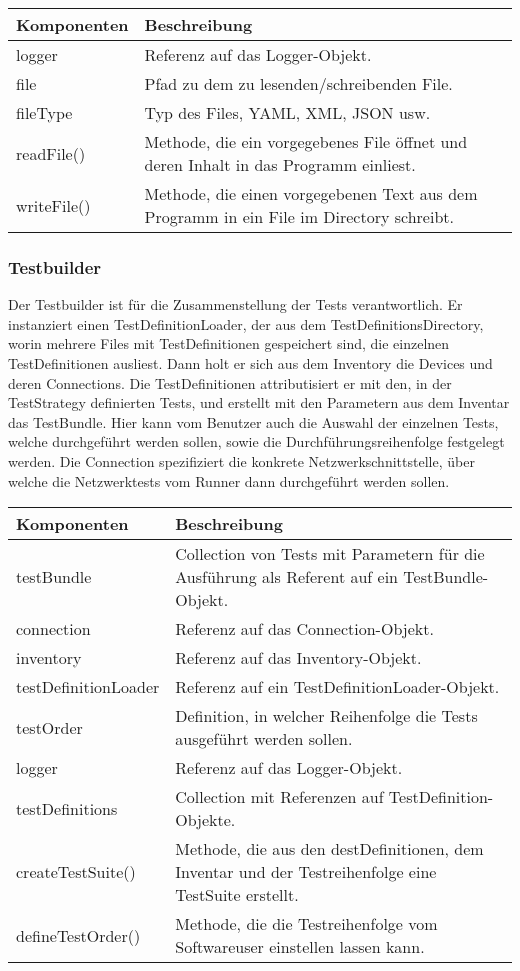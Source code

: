 \documentclass[
	ngerman,
	toc=listof, %
	toc=bibliography, %
	footnotes=multiple, %
	parskip=half, %
	numbers=noendperiod %
]{scrartcl}
\begin{document}
	\begin{tabularx}{\textwidth}{lX}
		\toprule
			Komponenten & Beschreibung \\
		\midrule
			logger & Referenz auf das Logger-Objekt. \\
			file & Pfad zu dem zu lesenden/schreibenden File. \\
			fileType & Typ des Files, YAML, XML, JSON usw. \\
		\midrule
			readFile() & Methode, die ein vorgegebenes File öffnet und deren Inhalt in das Programm einliest. \\
			writeFile() & Methode, die einen vorgegebenen Text aus dem Programm in ein File im Directory schreibt. \\
		\bottomrule
	\end{tabularx}

	\subsubsection{Testbuilder}
	Der Testbuilder ist für die Zusammenstellung der Tests verantwortlich. 
	Er instanziert einen TestDefinitionLoader, der aus dem TestDefinitionsDirectory, worin mehrere Files mit TestDefinitionen gespeichert sind, die einzelnen TestDefinitionen ausliest.
	Dann holt er sich aus dem Inventory die Devices und deren Connections. 
	Die TestDefinitionen attributisiert er mit den, in der TestStrategy definierten Tests, und erstellt mit den Parametern aus dem Inventar das TestBundle. 
	Hier kann vom Benutzer auch die Auswahl der einzelnen Tests, welche durchgeführt werden sollen, sowie die Durchführungsreihenfolge festgelegt werden.
	Die Connection spezifiziert die konkrete Netzwerkschnittstelle, über welche die Netzwerktests vom Runner dann durchgeführt werden sollen.

	\begin{tabularx}{\textwidth}{lX}
		\toprule
			Komponenten & Beschreibung \\
		\midrule
			testBundle & Collection von Tests mit Parametern für die Ausführung als Referent auf ein TestBundle-Objekt. \\
			connection & Referenz auf das Connection-Objekt. \\
			inventory & Referenz auf das Inventory-Objekt. \\
			testDefinitionLoader & Referenz auf ein TestDefinitionLoader-Objekt.\\
			testOrder & Definition, in welcher Reihenfolge die Tests ausgeführt werden sollen. \\
			logger & Referenz auf das Logger-Objekt.  \\
			testDefinitions & Collection mit Referenzen auf TestDefinition-Objekte. \\
		\midrule
			createTestSuite() & Methode, die aus den destDefinitionen, dem Inventar und der Testreihenfolge eine TestSuite erstellt. \\
			defineTestOrder() & Methode, die die Testreihenfolge vom Softwareuser einstellen lassen kann. \\
		\bottomrule
	\end{tabularx}
	\newpage
\end{document}
